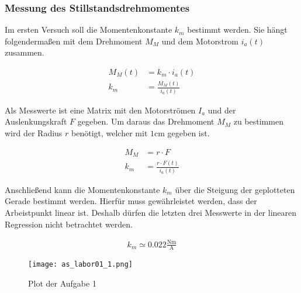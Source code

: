 \subsubsection{Messung des Stillstandsdrehmomentes}

Im ersten Versuch soll die Momentenkonstante $k_m$ bestimmt werden.
Sie hängt folgendermaßen mit dem Drehmoment $M_M$ und dem Motorstrom $i_a(t)$
zusammen. 

\begin{equation} \label{eq111}
    \begin{split}
        M_M(t)&=k_m \cdot i_a(t)\\
        k_m&=\frac{M_M(t)}{i_a(t)}
    \end{split}
\end{equation}

Als Messwerte ist eine Matrix mit den Motorströmen $I_a$ und der Auslenkungskraft $F$
gegeben. Um daraus das Drehmoment $M_M$ zu bestimmen wird der Radius $r$ benötigt,
welcher mit $1 \mathrm{cm}$ gegeben ist.

\begin{equation} \label{eq112}
    \begin{split}
        M_M&=r \cdot F \\
        k_m&=\frac{r\cdot F(t)}{i_a(t)}
    \end{split}
\end{equation}

Anschließend kann die Momentenkonstante $k_m$ über die Steigung der geplotteten
Gerade bestimmt werden. Hierfür muss gewährleistet werden, dass der Arbeistpunkt
linear ist. Deshalb dürfen die letzten drei Messwerte in der linearen Regression
nicht betrachtet werden.

\begin{equation} \label{eq113}
    \begin{split}
        k_m\simeq 0.022 \mathrm{\frac{Nm}{A}}
    \end{split}
\end{equation}

\begin{figure}[H]
 \centering
 \texttt{[image: as\_labor01\_1.png]}
 \caption{Plot der Aufgabe 1}
 \label{fig:PlotAufgabe1}
\end{figure}